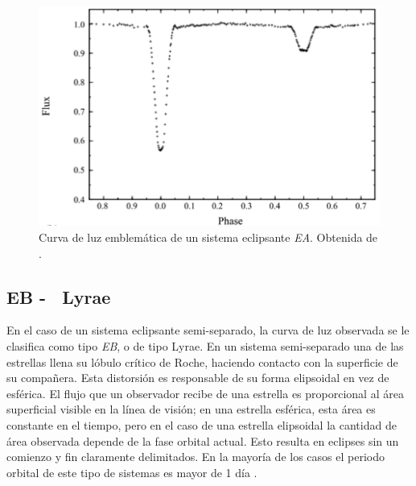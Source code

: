 \begin{figure}[!ht]
	\centering
	\includegraphics[scale=0.6]{Introduccion/Figures/Figura EA Curva_Modelling of WUMa Stars.png}
	\caption{Curva de luz emblemática de un sistema eclipsante
	\textit{EA}. Obtenida de
	.}
	\label{figuraEACurvaLuz}
\end{figure}

\subsection{EB - \textbeta \ Lyrae}

En el caso de un sistema eclipsante semi-separado, la curva de luz observada se
le clasifica como tipo \textit{EB}, o de tipo \textbeta \space Lyrae. En un sistema
semi-separado una de las estrellas llena su lóbulo crítico de Roche, haciendo
contacto con la superficie de su compañera. Esta distorsión es responsable de su
forma elipsoidal en vez de esférica. El flujo que un observador recibe de una
estrella es proporcional al área superficial visible en la línea de visión; en
una estrella esférica, esta área es constante en el tiempo, pero en el caso de
una estrella elipsoidal la cantidad de área observada depende de la fase orbital
actual. Esto resulta en eclipses sin un comienzo y fin claramente delimitados.
En la mayoría de los casos el periodo orbital de este tipo de sistemas es mayor
de 1 día . 


